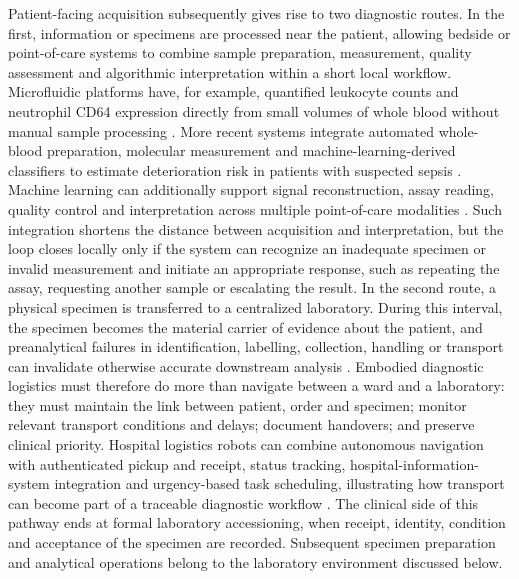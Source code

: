 Patient-facing acquisition subsequently gives rise to two diagnostic routes. In the first, information or specimens are processed near the patient, allowing bedside or point-of-care systems to combine sample preparation, measurement, quality assessment and algorithmic interpretation within a short local workflow. Microfluidic platforms have, for example, quantified leukocyte counts and neutrophil CD64 expression directly from small volumes of whole blood without manual sample processing \cite{Hassan2017POCMicrofluidic}. More recent systems integrate automated whole-blood preparation, molecular measurement and machine-learning-derived classifiers to estimate deterioration risk in patients with suspected sepsis \cite{Malic2025SepsisMicrofluidics}. Machine learning can additionally support signal reconstruction, assay reading, quality control and interpretation across multiple point-of-care modalities \cite{Han2025MLPOCT}. Such integration shortens the distance between acquisition and interpretation, but the loop closes locally only if the system can recognize an inadequate specimen or invalid measurement and initiate an appropriate response, such as repeating the assay, requesting another sample or escalating the result. In the second route, a physical specimen is transferred to a centralized laboratory. During this interval, the specimen becomes the material carrier of evidence about the patient, and preanalytical failures in identification, labelling, collection, handling or transport can invalidate otherwise accurate downstream analysis \cite{Nordin2024PreanalyticalErrors}. Embodied diagnostic logistics must therefore do more than navigate between a ward and a laboratory: they must maintain the link between patient, order and specimen; monitor relevant transport conditions and delays; document handovers; and preserve clinical priority. Hospital logistics robots can combine autonomous navigation with authenticated pickup and receipt, status tracking, hospital-information-system integration and urgency-based task scheduling, illustrating how transport can become part of a traceable diagnostic workflow \cite{Li2026HospitalLogisticsRobots}. The clinical side of this pathway ends at formal laboratory accessioning, when receipt, identity, condition and acceptance of the specimen are recorded. Subsequent specimen preparation and analytical operations belong to the laboratory environment discussed below.


